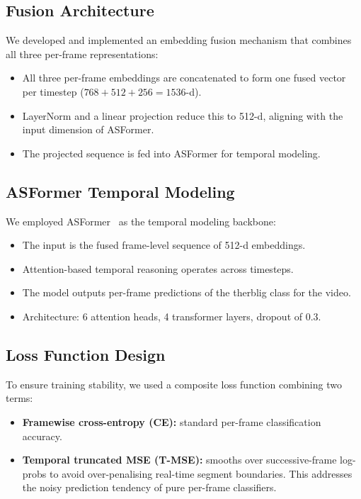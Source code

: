 \documentclass[11pt,a4paper]{article}
\begin{document}
\subsection{Fusion Architecture}

We developed and implemented an embedding fusion mechanism that combines all three per-frame representations:

\begin{itemize}[nosep]
  \item All three per-frame embeddings are concatenated to form one fused vector per timestep ($768 + 512 + 256 = 1536$-d).
  \item LayerNorm and a linear projection reduce this to 512-d, aligning with the input dimension of ASFormer.
  \item The projected sequence is fed into ASFormer for temporal modeling.
\end{itemize}

\subsection{ASFormer Temporal Modeling}

We employed ASFormer~\cite{asformer} as the temporal modeling backbone:

\begin{itemize}[nosep]
  \item The input is the fused frame-level sequence of 512-d embeddings.
  \item Attention-based temporal reasoning operates across timesteps.
  \item The model outputs per-frame predictions of the therblig class for the video.
  \item Architecture: 6 attention heads, 4 transformer layers, dropout of 0.3.
\end{itemize}

\subsection{Loss Function Design}

To ensure training stability, we used a composite loss function combining two terms:

\begin{itemize}[nosep]
  \item \textbf{Framewise cross-entropy (CE):} standard per-frame classification accuracy.
  \item \textbf{Temporal truncated MSE (T-MSE):} smooths over successive-frame log-probs to avoid over-penalising real-time segment boundaries. This addresses the noisy prediction tendency of pure per-frame classifiers.
\end{itemize}
\end{document}
